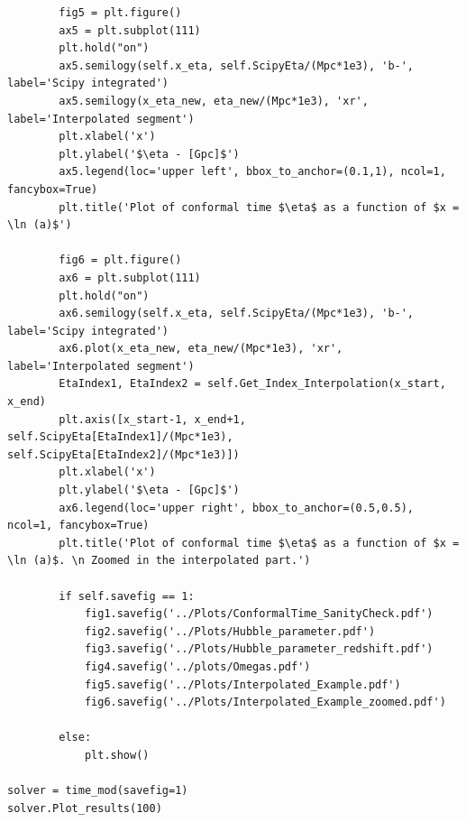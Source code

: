 \documentclass[12pt]{article}
\begin{document}
\begin{lstlisting}
		fig5 = plt.figure()
		ax5 = plt.subplot(111)
		plt.hold("on")
		ax5.semilogy(self.x_eta, self.ScipyEta/(Mpc*1e3), 'b-', label='Scipy integrated')
		ax5.semilogy(x_eta_new, eta_new/(Mpc*1e3), 'xr', label='Interpolated segment')
		plt.xlabel('x')
		plt.ylabel('$\eta - [Gpc]$')
		ax5.legend(loc='upper left', bbox_to_anchor=(0.1,1), ncol=1, fancybox=True)
		plt.title('Plot of conformal time $\eta$ as a function of $x = \ln (a)$')
		
		fig6 = plt.figure()
		ax6 = plt.subplot(111)
		plt.hold("on")		
		ax6.semilogy(self.x_eta, self.ScipyEta/(Mpc*1e3), 'b-', label='Scipy integrated')
		ax6.plot(x_eta_new, eta_new/(Mpc*1e3), 'xr', label='Interpolated segment')
		EtaIndex1, EtaIndex2 = self.Get_Index_Interpolation(x_start, x_end)
		plt.axis([x_start-1, x_end+1, self.ScipyEta[EtaIndex1]/(Mpc*1e3), self.ScipyEta[EtaIndex2]/(Mpc*1e3)])
		plt.xlabel('x')
		plt.ylabel('$\eta - [Gpc]$')
		ax6.legend(loc='upper right', bbox_to_anchor=(0.5,0.5), ncol=1, fancybox=True)
		plt.title('Plot of conformal time $\eta$ as a function of $x = \ln (a)$. \n Zoomed in the interpolated part.')

		if self.savefig == 1:
			fig1.savefig('../Plots/ConformalTime_SanityCheck.pdf')
			fig2.savefig('../Plots/Hubble_parameter.pdf')
			fig3.savefig('../Plots/Hubble_parameter_redshift.pdf')
			fig4.savefig('../plots/Omegas.pdf')
			fig5.savefig('../Plots/Interpolated_Example.pdf')
			fig6.savefig('../Plots/Interpolated_Example_zoomed.pdf')
			
		else:
			plt.show()

solver = time_mod(savefig=1)
solver.Plot_results(100)
\end{lstlisting}
\end{document}
